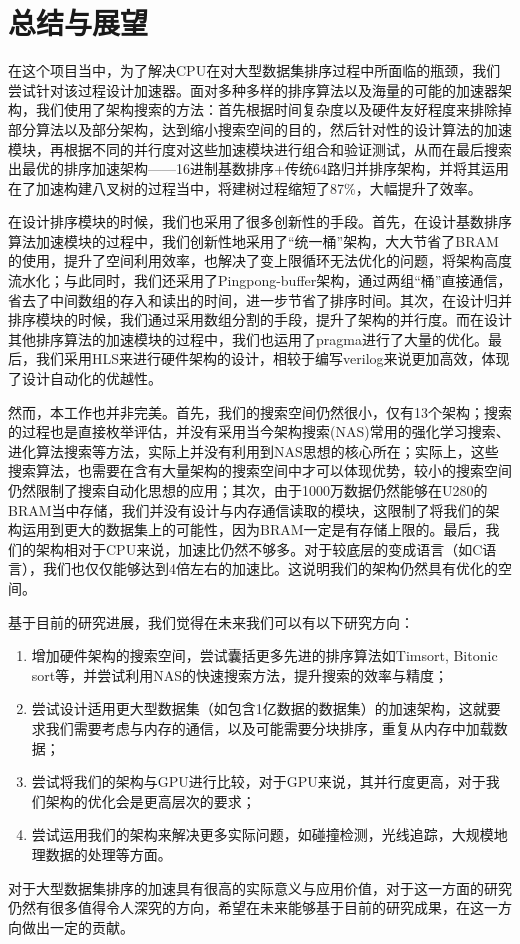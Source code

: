 
\chapter{总结与展望}


在这个项目当中，为了解决CPU在对大型数据集排序过程中所面临的瓶颈，我们尝试针对该过程设计加速器。面对多种多样的排序算法以及海量的可能的加速器架构，我们使用了架构搜索的方法：首先根据时间复杂度以及硬件友好程度来排除掉部分算法以及部分架构，达到缩小搜索空间的目的，然后针对性的设计算法的加速模块，再根据不同的并行度对这些加速模块进行组合和验证测试，从而在最后搜索出最优的排序加速架构——16进制基数排序+传统64路归并排序架构，并将其运用在了加速构建八叉树的过程当中，将建树过程缩短了87\%，大幅提升了效率。

在设计排序模块的时候，我们也采用了很多创新性的手段。首先，在设计基数排序算法加速模块的过程中，我们创新性地采用了“统一桶”架构，大大节省了BRAM的使用，提升了空间利用效率，也解决了变上限循环无法优化的问题，将架构高度流水化；与此同时，我们还采用了Pingpong-buffer架构，通过两组“桶”直接通信，省去了中间数组的存入和读出的时间，进一步节省了排序时间。其次，在设计归并排序模块的时候，我们通过采用数组分割的手段，提升了架构的并行度。而在设计其他排序算法的加速模块的过程中，我们也运用了pragma进行了大量的优化。最后，我们采用HLS来进行硬件架构的设计，相较于编写verilog来说更加高效，体现了设计自动化的优越性。

然而，本工作也并非完美。首先，我们的搜索空间仍然很小，仅有13个架构；搜索的过程也是直接枚举评估，并没有采用当今架构搜索(NAS)常用的强化学习搜索、进化算法搜索等方法，实际上并没有利用到NAS思想的核心所在；实际上，这些搜索算法，也需要在含有大量架构的搜索空间中才可以体现优势，较小的搜索空间仍然限制了搜索自动化思想的应用；其次，由于1000万数据仍然能够在U280的BRAM当中存储，我们并没有设计与内存通信读取的模块，这限制了将我们的架构运用到更大的数据集上的可能性，因为BRAM一定是有存储上限的。最后，我们的架构相对于CPU来说，加速比仍然不够多。对于较底层的变成语言（如C语言），我们也仅仅能够达到4倍左右的加速比。这说明我们的架构仍然具有优化的空间。

基于目前的研究进展，我们觉得在未来我们可以有以下研究方向：
\begin{enumerate}
    \item 增加硬件架构的搜索空间，尝试囊括更多先进的排序算法如Timsort, Bitonic sort等，并尝试利用NAS的快速搜索方法，提升搜索的效率与精度；
    \item 尝试设计适用更大型数据集（如包含1亿数据的数据集）的加速架构，这就要求我们需要考虑与内存的通信，以及可能需要分块排序，重复从内存中加载数据；
    \item 尝试将我们的架构与GPU进行比较，对于GPU来说，其并行度更高，对于我们架构的优化会是更高层次的要求；
    \item 尝试运用我们的架构来解决更多实际问题，如碰撞检测，光线追踪，大规模地理数据的处理等方面。
\end{enumerate}

对于大型数据集排序的加速具有很高的实际意义与应用价值，对于这一方面的研究仍然有很多值得令人深究的方向，希望在未来能够基于目前的研究成果，在这一方向做出一定的贡献。